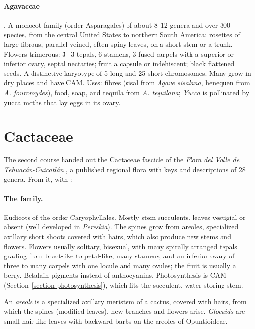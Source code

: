 \paragraph{Agavaceae}
\cite[Chapter 7]{simpson2006plant}. A
monocot family (order Asparagales) of about
8--12 genera and over 300 species, from the
central United States to northern South
America: rosettes of large fibrous,
parallel-veined, often spiny leaves, on a
short stem or a trunk. Flowers trimerous:
3+3 tepals, 6 stamens, 3 fused carpels with
a superior or inferior ovary, septal
nectaries; fruit a capsule or
indehiscent; black
flattened seeds. A distinctive karyotype of
5 long and 25 short chromosomes. Many grow
in dry places and have CAM. Uses: fibres
(sisal from \emph{Agave sisalana},
henequen from \emph{A. fourcroydes}), food,
soap, and tequila from \emph{A. tequilana};
\emph{Yucca} is pollinated by yucca moths
that lay eggs in its ovary.

\section{Cactaceae}
\label{section-cactaceae}

The second course handed out the Cactaceae
fascicle of the \emph{Flora del Valle de
Tehuac\'an-Cuicatl\'an}
\cite{arias2012cactaceae}, a published
regional flora with keys and descriptions
of 28 genera. From it, with
\cite[Chapter 8]{simpson2006plant}:

\paragraph{The family.}
Eudicots of the order Caryophyllales.
Mostly stem succulents, leaves vestigial
or absent (well developed in
\emph{Pereskia}). The spines grow from
areoles, specialized axillary short shoots
covered with hairs, which also produce new
stems and flowers. Flowers usually
solitary, bisexual, with many spirally
arranged tepals grading from bract-like to
petal-like, many stamens, and an inferior
ovary of three to many carpels with one
locule and many ovules; the fruit is
usually a berry. Betalain pigments instead
of anthocyanins. Photosynthesis is CAM
(Section~\ref{section-photosynthesis}),
which fits the succulent, water-storing
stem.

\begin{definition}
\label{definition-areole}
An \emph{areole} is a specialized
axillary meristem of a cactus, covered with
hairs, from which the spines (modified
leaves), new branches and flowers arise.
\emph{Glochids} are small hair-like
leaves with backward barbs on the areoles
of Opuntioideae.
\end{definition}

